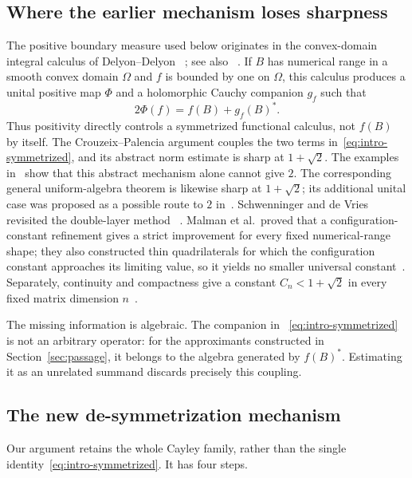 \documentclass{aomart}
\theoremstyle{definition}
\begin{document}
\subsection{Where the earlier mechanism loses sharpness}

The positive boundary measure used below originates in the
convex-domain integral calculus of Delyon--Delyon~%
\cite{DelyonDelyon1999}; see also~%
\cite{BadeaCrouzeixDelyon2006,CrouzeixPalencia2017}.  If $B$ has
numerical range in a smooth convex domain $\Omega$ and $f$ is bounded
by one on $\Omega$, this calculus produces a unital positive map
$\Phi$ and a holomorphic Cauchy companion $g_f$ such that
\begin{equation}
  2\Phi(f)=f(B)+g_f(B)^*.
  \label{eq:intro-symmetrized}
\end{equation}
Thus positivity directly controls a symmetrized functional calculus,
not $f(B)$ by itself.  The Crouzeix--Palencia argument couples the two
terms in~\eqref{eq:intro-symmetrized}, and its abstract norm estimate is
sharp at $1+\sqrt2$.  The examples in~%
\cite{RansfordSchwenninger2018} show that this abstract mechanism alone
cannot give $2$.  The corresponding general uniform-algebra theorem is
likewise sharp at $1+\sqrt2$; its additional unital case was proposed
as a possible route to $2$ in~\cite{ClouatreOstermannRansford2023}.
Schwenninger and de Vries revisited the double-layer method~%
\cite{SchwenningerDeVries2025}.  Malman et al.\ proved that a
configuration-constant refinement gives a strict improvement for every
fixed numerical-range shape; they also constructed thin quadrilaterals
for which the configuration constant approaches its limiting value, so
it yields no smaller universal constant~\cite{MalmanEtAl2025}.
Separately,
continuity and compactness give a constant $C_n<1+\sqrt2$ in every
fixed matrix dimension $n$~\cite{MalmanRatio2024}.

The missing information is algebraic.  The companion in~%
\eqref{eq:intro-symmetrized} is not an arbitrary operator: for the
approximants constructed in Section~\ref{sec:passage}, it belongs to
the algebra generated by $f(B)^*$.  Estimating it as an unrelated
summand discards precisely this coupling.

\subsection{The new de-symmetrization mechanism}

Our argument retains the whole Cayley family, rather than the single
identity~\eqref{eq:intro-symmetrized}.  It has four steps.
\end{document}
